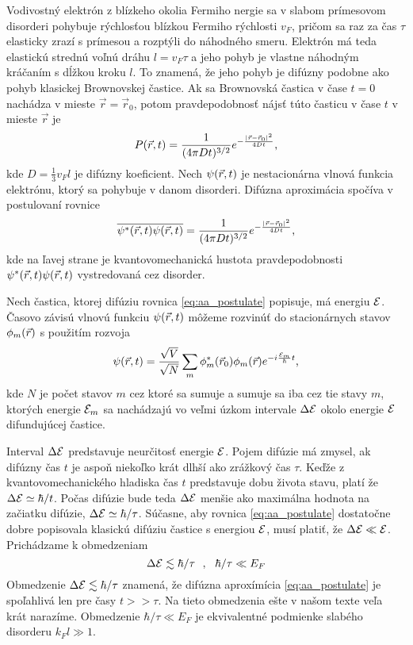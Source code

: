  Vodivostný elektrón z blízkeho okolia Fermiho nergie sa v slabom prímesovom disorderi pohybuje rýchlosťou blízkou Fermiho rýchlosti $v_F$, pričom sa raz za čas $\tau$ elasticky zrazí s prímesou a rozptýli do náhodného smeru. Elektrón má teda elastickú strednú voľnú dráhu $l=v_F\tau$ a jeho pohyb je vlastne náhodným kráčaním s dĺžkou kroku $l$. To znamená, že jeho pohyb je difúzny podobne ako pohyb klasickej Brownovskej častice.
Ak sa Brownovská častica v čase $t=0$ nachádza v mieste $\vec r = \vec r_0$, potom pravdepodobnosť nájsť túto časticu v čase $t$  v mieste $\vec r$ je
\begin{equation}
 \label{eq:diffusion}
 P(\vec{r},t)=\frac{1}{(4\pi Dt)^{3/2}}e^{-\frac{|\vec{r}-\vec{r}_0|^2}{4Dt}} \text{,}
\end{equation}
kde $D =\frac{1}{3}v_Fl $ je difúzny koeficient.
Nech $\psi(\vec{r},t)$ je nestacionárna vlnová funkcia elektrónu, ktorý sa pohybuje v danom disorderi.
Difúzna aproximácia spočíva v postulovaní rovnice
\begin{equation}
 \label{eq:aa_postulate}
 \overline{\psi^*(\vec{r},t)\psi(\vec{r},t)}=\frac{1}{(4\pi Dt)^{3/2}}e^{-\frac{|\vec{r}-\vec{r}_0|^2}{4Dt}} \text{,}
\end{equation}
kde na ľavej strane je kvantovomechanická hustota pravdepodobnosti $\psi^*(\vec{r},t)\psi(\vec{r},t)$ vystredovaná cez disorder.

Nech častica, ktorej difúziu rovnica \eqref{eq:aa_postulate} popisuje, má energiu $\mathcal{E}$.
Časovo závisú vlnovú funkciu $\psi(\vec{r},t)$ môžeme rozvinúť do stacionárnych stavov $\phi_m(\vec{r})$ s použitím rozvoja
\begin{equation}
 \label{eq:aa_psi_sum}
 \psi(\vec{r},t)=\frac{\sqrt{V}}{\sqrt{N}}\sum_m \phi_m^*(\vec{r}_0)\phi_m(\vec{r})e^{-i\frac{\mathcal{E}_m}{\hbar}t} \text{,}
\end{equation}
kde $N$ je počet stavov $m$ cez ktoré sa sumuje a sumuje sa iba cez tie stavy $m$, ktorých energie $\mathcal{E}_m$ sa nachádzajú vo veľmi úzkom intervale $\Delta \mathcal{E}$ okolo energie $\mathcal{E}$ difundujúcej častice.

Interval $\Delta \mathcal{E}$ predstavuje neurčitosť energie $\mathcal{E}$. Pojem difúzie má zmysel, ak difúzny čas $t$ je aspoň niekoľko krát dlhší ako zrážkový čas $\tau$. Keďže z kvantovomechanického hladiska čas $t$ predstavuje
dobu života stavu, platí že $\Delta \mathcal{E} \simeq \hbar/t$. Počas difúzie bude teda $\Delta \mathcal{E}$ menšie ako maximálna hodnota na začiatku difúzie, $\Delta \mathcal{E} \simeq \hbar/\tau$. Súčasne, aby rovnica \eqref{eq:aa_postulate} dostatočne dobre popisovala
klasickú difúziu častice s energiou $\mathcal{E}$, musí platiť, že $\Delta \mathcal{E} \ll \mathcal{E} $. Prichádzame k obmedzeniam
\begin{equation}
 \label{eq:obmedzenia}
 \Delta \mathcal{E} \lesssim \hbar/\tau \ \ , \ \  \hbar/\tau \ll E_F
\end{equation}
Obmedzenie $\Delta \mathcal{E} \lesssim \hbar/\tau$ znamená, že difúzna aproxímícia \eqref{eq:aa_postulate} je spoľahlivá len pre časy $t >> \tau$. Na tieto obmedzenia ešte v našom texte
veľa krát narazíme.  Obmedzenie $\hbar/\tau \ll E_F$ je ekvivalentné podmienke slabého disorderu $k_Fl \gg 1$.

